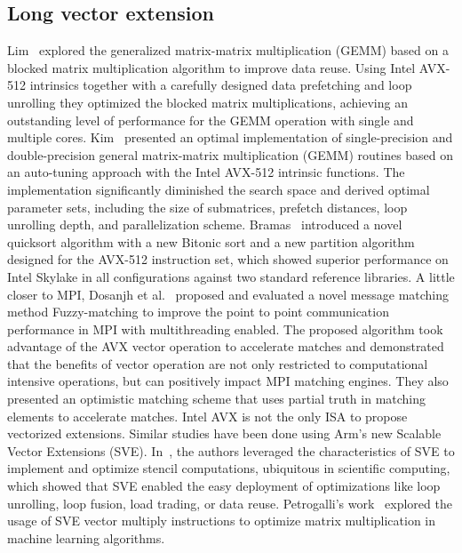 \documentclass[5p,times,twocolumn]{elsarticle}
\newcommand{\sve}[0]{\textsc{SVE}\xspace}
\begin{document}
\subsection{Long vector extension}
Lim~\cite{Lim2018} explored the generalized matrix-matrix multiplication (GEMM) based on a blocked matrix multiplication algorithm to
improve data reuse. Using Intel AVX-512 intrinsics together with a carefully designed data prefetching and loop unrolling they
optimized the blocked matrix multiplications, achieving an outstanding level of performance for the GEMM operation with single and multiple cores.
%
Kim~\cite{Kim19} presented an optimal implementation of single-precision and double-precision general matrix-matrix multiplication (GEMM) routines based on an auto-tuning approach with the Intel AVX-512 intrinsic functions.
The implementation significantly diminished the search space and derived optimal parameter sets, including the size of submatrices, prefetch distances, loop unrolling depth, and parallelization scheme.
%
Bramas~\cite{Bramas2017} introduced a novel quicksort algorithm with a new Bitonic sort and a new
partition algorithm designed for the AVX-512
instruction set, which showed superior performance on Intel Skylake in
all configurations against two standard reference libraries.
%
A little closer to MPI, Dosanjh et al.~\cite{tag-match} proposed and evaluated a novel message matching method Fuzzy-matching
to improve the point to point communication performance in MPI with multithreading enabled.
The proposed algorithm took advantage of the AVX vector operation to accelerate matches
and demonstrated that the benefits of vector operation are not only restricted to computational intensive operations, but can positively impact MPI matching engines. They also presented an optimistic
matching scheme that uses partial truth in matching elements
to accelerate matches.
%
Intel AVX is not the only ISA to propose vectorized extensions. Similar studies have been done using Arm's new Scalable Vector Extensions (SVE).
In~\cite{sve-stencil}, the authors leveraged the characteristics of \sve to implement and optimize stencil computations, ubiquitous in scientific computing, which showed
that \sve enabled the easy deployment of optimizations like loop unrolling,
loop fusion, load trading, or data reuse.
%
Petrogalli's work~\cite{sveml} explored the usage of SVE vector multiply
instructions to optimize matrix multiplication in machine learning algorithms. %
\end{document}
